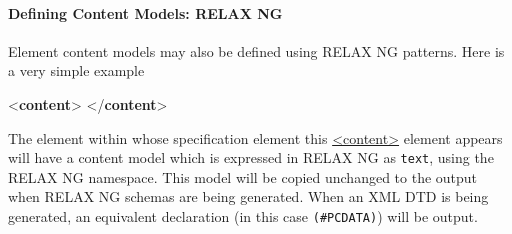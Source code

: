 \paragraph[{Defining Content Models: RELAX NG}]{Defining Content Models: RELAX NG}\label{TDTAGCONT}\par
Element content models may also be defined using RELAX NG patterns. Here is a very simple example \par\bgroup{}\exampleFont \begin{shaded}\noindent\mbox{}{<\textbf{content}>}\mbox{}\newline 
{}\mbox{}\newline 
{</\textbf{content}>}\end{shaded}\egroup\par \noindent  The element within whose specification element this \hyperref[TEI.content]{<content>} element appears will have a content model which is expressed in RELAX NG as \texttt{text}, using the RELAX NG namespace. This model will be copied unchanged to the output when RELAX NG schemas are being generated. When an XML DTD is being generated, an equivalent declaration (in this case \texttt{(\#PCDATA)}) will be output.\par
